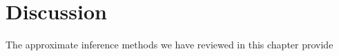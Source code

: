 

\section{Discussion}

The approximate inference methods we have reviewed in this chapter provide

